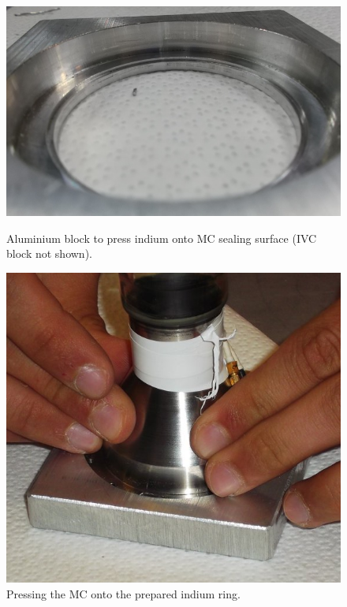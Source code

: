 \begin{figure}[htbp!]
 \centering
 \begin{minipage}{0.45\textwidth}
 \includegraphics[width=\textwidth]{./img/indium-seal-block-mc.jpg}
 \caption{Aluminium block to press indium onto MC sealing surface (IVC block not shown).}
 \label{fig:indium-seal-block-mc}
 \end{minipage}
 \quad
 \begin{minipage}{0.45\textwidth}
 \includegraphics[width=\textwidth]{./img/indium-seal-block-mc-press.jpg}
 \caption{Pressing the MC onto the prepared indium ring.}
 \label{fig:indium-seal-block-mc-press}
 \end{minipage}
\end{figure}

